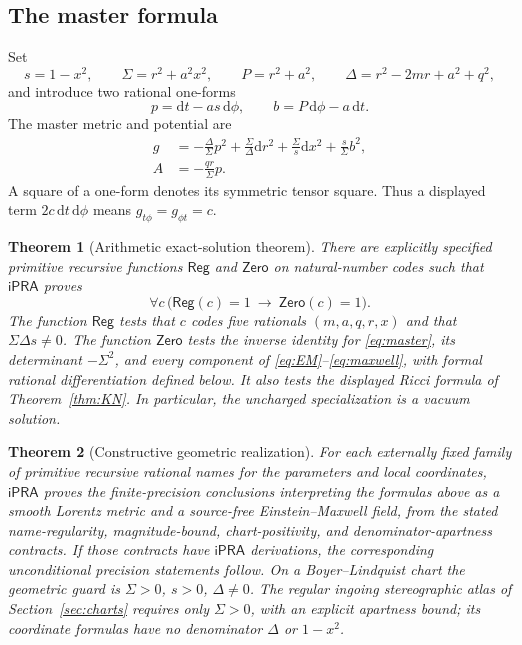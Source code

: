 \documentclass[11pt,a4paper]{article}
\numberwithin{equation}{section}
\newtheorem{theorem}{Theorem}[section]
\theoremstyle{definition}\newtheorem{definition}[theorem]{Definition}
\theoremstyle{remark}\newtheorem{remark}[theorem]{Remark}
\newcommand{\ipra}{\mathsf{iPRA}}
\newcommand{\dd}{\mathrm{d}}
\begin{document}
\subsection{The master formula}
Set
\begin{equation}\label{eq:notation}
 s=1-x^2,\qquad \Sigma=r^2+a^2x^2,\qquad P=r^2+a^2,
 \qquad \Delta=r^2-2mr+a^2+q^2,
\end{equation}
and introduce two rational one-forms
\begin{equation}\label{eq:pb}
 p=\dd t-a s\,\dd\phi,\qquad b=P\,\dd\phi-a\,\dd t.
\end{equation}
The master metric and potential are
\begin{align}
 g&=-\frac{\Delta}{\Sigma}p^2+\frac{\Sigma}{\Delta}\dd r^2
       +\frac{\Sigma}{s}\dd x^2+\frac{s}{\Sigma}b^2,\label{eq:master}\\
 A&=-\frac{qr}{\Sigma}p.\label{eq:potential}
\end{align}
A square of a one-form denotes its symmetric tensor square. Thus a displayed term $2c\,\dd t\,\dd\phi$ means $g_{t\phi}=g_{\phi t}=c$.

\begin{theorem}[Arithmetic exact-solution theorem]\label{thm:arithmetic}
There are explicitly specified primitive recursive functions $\mathsf{Reg}$ and $\mathsf{Zero}$ on natural-number codes such that $\ipra$ proves
\begin{equation}\label{eq:literal}
 \forall c\,\bigl(\mathsf{Reg}(c)=1\ \longrightarrow\ \mathsf{Zero}(c)=1\bigr).
\end{equation}
The function $\mathsf{Reg}$ tests that $c$ codes five rationals $(m,a,q,r,x)$ and that $\Sigma\Delta s\ne0$. The function $\mathsf{Zero}$ tests the inverse identity for \eqref{eq:master}, its determinant $-\Sigma^2$, and every component of \eqref{eq:EM}--\eqref{eq:maxwell}, with formal rational differentiation defined below. It also tests the displayed Ricci formula of Theorem~\ref{thm:KN}. In particular, the uncharged specialization is a vacuum solution.
\end{theorem}

\begin{theorem}[Constructive geometric realization]\label{thm:real-summary}
For each externally fixed family of primitive recursive rational names for the parameters and local coordinates, $\ipra$ proves the finite-precision conclusions interpreting the formulas above as a smooth Lorentz metric and a source-free Einstein--Maxwell field, \emph{from the stated name-regularity, magnitude-bound, chart-positivity, and denominator-apartness contracts}. If those contracts have $\ipra$ derivations, the corresponding unconditional precision statements follow. On a Boyer--Lindquist chart the geometric guard is $\Sigma>0$, $s>0$, $\Delta\ne0$. The regular ingoing stereographic atlas of Section~\ref{sec:charts} requires only $\Sigma>0$, with an explicit apartness bound; its coordinate formulas have no denominator $\Delta$ or $1-x^2$.
\end{theorem}
\end{document}

